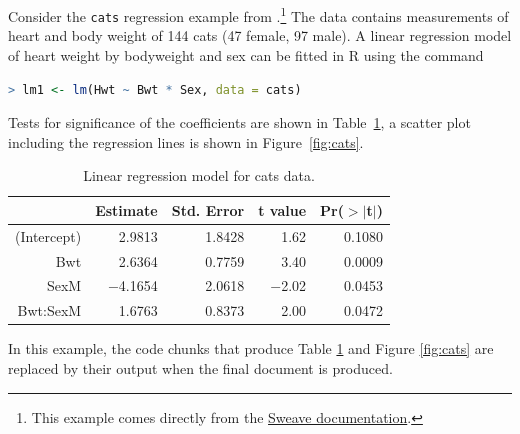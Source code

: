 \documentclass[11pt,article]{memoir}
\begin{document}
\label{sec:append-sweave-exampl}
Consider the \texttt{cats} regression example from
\citet{venables02:_moder_applied_statis_s_plus}.\footnote{This example comes
  directly from the \href{http://www.ci.tuwien.ac.at/~leisch/Sweave/}{Sweave documentation}.} The data contains 
measurements of heart and body weight of 144 cats (47 female, 97 male). A
linear regression model of heart weight by bodyweight and sex can be fitted in
R using the command

\begin{lstlisting}[language=R,numbers=none]
> lm1 <- lm(Hwt ~ Bwt * Sex, data = cats)
\end{lstlisting}
\normalsize 
Tests for significance of the coefficients are shown in
Table~\ref{tab:coef}, a scatter plot including the regression lines is
shown in Figure~\ref{fig:cats}.


\begin{table}[ht]
\footnotesize
\begin{center}
\begin{tabular}{rrrrr}
\hline
 & Estimate & Std. Error & t value & Pr($>$$|$t$|$) \\
\hline
(Intercept) & 2.9813 & 1.8428 & 1.62 & 0.1080 \\
Bwt & 2.6364 & 0.7759 & 3.40 & 0.0009 \\
SexM & $-$4.1654 & 2.0618 & $-$2.02 & 0.0453 \\
Bwt:SexM & 1.6763 & 0.8373 & 2.00 & 0.0472 \\
\hline
\end{tabular}
\caption{\small Linear regression model for cats data.}
\label{tab:coef}
\end{center}
\end{table}
\normalsize 

In this example, the code chunks that produce Table \ref{tab:coef} and Figure
\ref{fig:cats} are replaced by their output when the final document is produced. 
\end{document}
